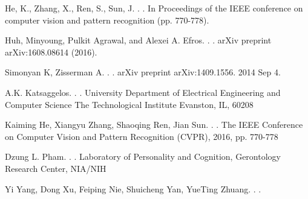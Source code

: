\documentclass[11pt]{article}
\begin{document}
\begin{thebibliography}{}
He, K., Zhang, X., Ren, S., Sun, J.
.
.
\newblock In Proceedings of the IEEE conference on computer vision and pattern recognition (pp. 770-778).


Huh, Minyoung, Pulkit Agrawal, and Alexei A. Efros.
.
.
\newblock arXiv preprint arXiv:1608.08614 (2016).


Simonyan K, Zisserman A.
.
.
\newblock arXiv preprint arXiv:1409.1556. 2014 Sep 4.

A.K. Katsaggelos.
.
.
\newblock  University Department of Electrical Engineering and Computer Science The Technological Institute Evanston, IL, 60208

 Kaiming He, Xiangyu Zhang, Shaoqing Ren, Jian Sun.
.
.
\newblock The IEEE Conference on Computer Vision and Pattern Recognition (CVPR), 2016, pp. 770-778

Dzung L. Pham.
.
.
\newblock  Laboratory of Personality and Cognition, Gerontology Research Center, NIA/NIH

Yi Yang, Dong Xu, Feiping Nie, Shuicheng Yan, YueTing Zhuang.
.
.
\newblock  





\end{thebibliography}
\end{document}
